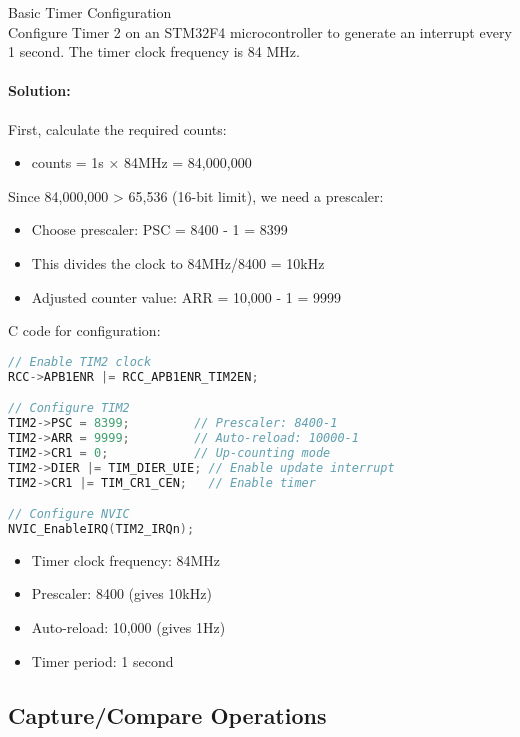 \begin{example2}{Basic Timer Configuration}\\
Configure Timer 2 on an STM32F4 microcontroller to generate an interrupt every 1 second. The timer clock frequency is 84 MHz.
\paragraph{Solution:}
First, calculate the required counts:
\begin{itemize}
    \item counts = 1s × 84MHz = 84,000,000
\end{itemize}

Since 84,000,000 > 65,536 (16-bit limit), we need a prescaler:
\begin{itemize}
    \item Choose prescaler: PSC = 8400 - 1 = 8399
    \item This divides the clock to 84MHz/8400 = 10kHz
    \item Adjusted counter value: ARR = 10,000 - 1 = 9999
\end{itemize}

C code for configuration:
\begin{lstlisting}[language=C, style=basesmol]
// Enable TIM2 clock
RCC->APB1ENR |= RCC_APB1ENR_TIM2EN;

// Configure TIM2
TIM2->PSC = 8399;         // Prescaler: 8400-1
TIM2->ARR = 9999;         // Auto-reload: 10000-1
TIM2->CR1 = 0;            // Up-counting mode
TIM2->DIER |= TIM_DIER_UIE; // Enable update interrupt
TIM2->CR1 |= TIM_CR1_CEN;   // Enable timer

// Configure NVIC
NVIC_EnableIRQ(TIM2_IRQn);
\end{lstlisting}

\begin{itemize}
    \item Timer clock frequency: 84MHz
    \item Prescaler: 8400 (gives 10kHz)
    \item Auto-reload: 10,000 (gives 1Hz)
    \item Timer period: 1 second
\end{itemize}
\end{example2}

\subsection{Capture/Compare Operations}

